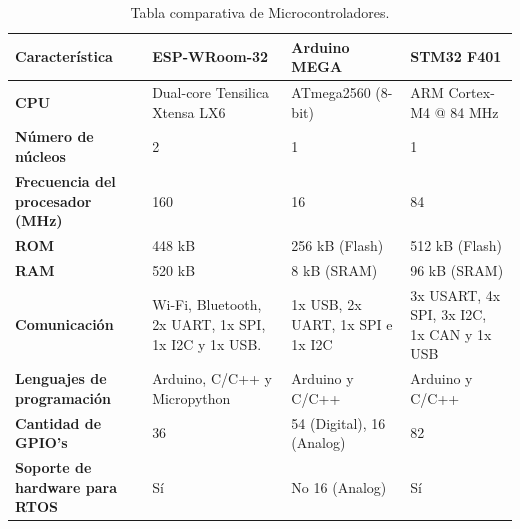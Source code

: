\begin{table}[h]
    \centering
    \caption{Tabla comparativa de Microcontroladores.}
    \begin{tabular}{p{3cm} p{3cm} p{2.5cm} p{2.5cm} }
    \toprule

        \textbf{Característica}           & \textbf{ESP-WRoom-32}               & \textbf{Arduino MEGA}               & \textbf{STM32 F401} \\
        \midrule
        \textbf{CPU}                    & Dual-core Tensilica Xtensa LX6     & ATmega2560 (8-bit)                  & ARM Cortex-M4 @ 84 MHz               \\
        
        \textbf{Número de núcleos}       & 2                                  & 1                                  & 1                                   \\
        
        \textbf{Frecuencia del procesador (MHz)}  & 160                       & 16                                 & 84                                  \\

        \textbf{ROM}             & 448 kB                             & 256 kB (Flash)                     & 512 kB (Flash)                      \\

        \textbf{RAM}             & 520 kB                             & 8 kB (SRAM)                        & 96 kB (SRAM)                        \\

        \textbf{Comunicación} & Wi-Fi, Bluetooth, 2x UART, 1x SPI, 1x I2C y 1x USB.    & 1x USB, 2x UART, 1x SPI e 1x I2C                 & 3x USART, 4x SPI, 3x I2C, 1x CAN y 1x USB  \\

        \textbf{Lenguajes de programación} & Arduino, C/C++ y Micropython  & Arduino y C/C++               & Arduino y C/C++                  \\

        \textbf{Cantidad de GPIO's }       & 36            & 54 (Digital), 16 (Analog)           & 82                                  \\

        \textbf{Soporte de hardware para RTOS} & Sí        & No 16 (Analog)           & Sí                                 \\
    \bottomrule
    \hline
    \end{tabular}
    \label{tabla:comparativa}
\end{table}


